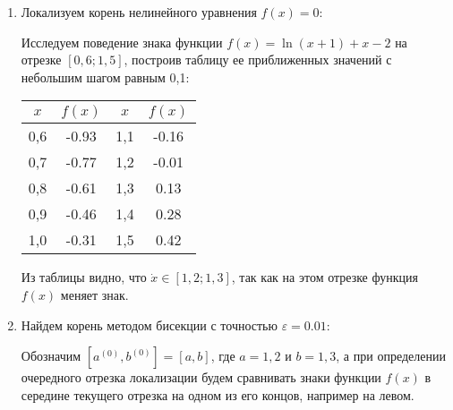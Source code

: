\documentclass[a4paper,12pt]{article} %
\begin{document}
\begin{enumerate}

\item Локализуем корень нелинейного уравнения $f(x) = 0$:
\vspace{0.5cm}

\vspace{0.5cm}

Исследуем поведение знака функции $f(x) = \ln (x + 1) + x - 2$ на отрезке $[0,6; 1,5]$, построив таблицу ее приближенных значений с небольшим шагом равным 0,1:
\vspace{0.5cm}

\begin{tabular}{ || c | c || c  | c || }
\hline
$x$ & $f(x)$ & $x$ & $f(x)$\\ \hline 
0,6 & -0.93 & 1,1 & -0.16  \\ 
0,7 & -0.77 & 1,2 & -0.01 \\ 
0,8 & -0.61 & 1,3 & 0.13 \\
0,9 & -0.46 & 1,4 & 0.28 \\
1,0 & -0.31 & 1,5 & 0.42 \\
\hline
\end{tabular}
\vspace{0.5cm}

Из таблицы видно, что $\dot x \in [1,2; 1,3]$, так как на этом отрезке функция $f(x)$ меняет знак.

\item Найдем корень методом бисекции с точностью $\varepsilon = 0.01$:

Обозначим $[a^{(0)}, b^{(0)}] = [a, b]$, где $a = 1,2$ и $b = 1,3$, а при определении очередного отрезка локализации будем сравнивать знаки функции $f(x)$ в середине текущего отрезка на одном из его концов, например на левом.


\end{enumerate}
\end{document}

